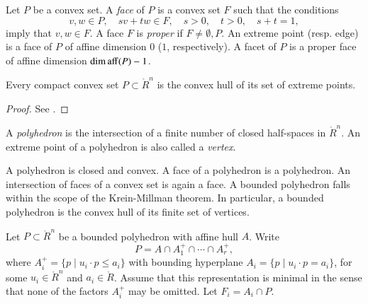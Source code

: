 \begin{definition}
Let $P$ be a convex set.  A {\it face} of $P$ is a convex set $F$ such that the conditions
$$
v,w\in P,\quad s v + t w \in F,\quad s>0,\quad t>0,\quad s+t = 1,
$$ 
imply that $v,w\in F$.  A face $F$ is {\it proper} if $F\ne \emptyset,P$.    An extreme point (resp. edge) is a face of $P$ of affine dimension $0$ ($1$, respectively).   A facet of $P$ is a proper face of affine dimension $\operatorname{dim\,aff}(P)-1$.
\end{definition}


\begin{lemma} Every compact convex set $P\subset\ring{R}^n$ is the convex hull of its set of extreme points.
\end{lemma}

\begin{proof}  See \cite[Theorem~2.6.16]{webster:1994}.
\end{proof}


\begin{definition}  A {\it polyhedron} is the intersection of
a finite number of closed half-spaces in $\ring{R}^n$.  An extreme point of a polyhedron is also called a {\it vertex}.
\end{definition}

A polyhedron is closed and convex.  A face of a polyhedron is a polyhedron.  An intersection of faces of a convex set is again a face.  A bounded polyhedron falls within the scope of the Krein-Millman theorem.  In particular, a bounded polyhedron is the convex hull of its finite set of vertices.

Let $P\subset\ring{R}^n$ be a bounded polyhedron with affine hull $A$. Write 
$$
P = A \cap A^+_1 \cap \cdots \cap A^+_r,
$$
where
$A^+_i = \{p\mid u_i\cdot p \le a_i\}$ with bounding hyperplane
$A_i=\{p\mid u_i \cdot p = a_i\}$, for some $u_i\in \ring{R}^n$ and $a_i\in\ring{R}$. 
Assume that this representation is minimal in the sense that none of the factors $A^+_i$ may be omitted.  Let $F_i = A_i\cap P$.


